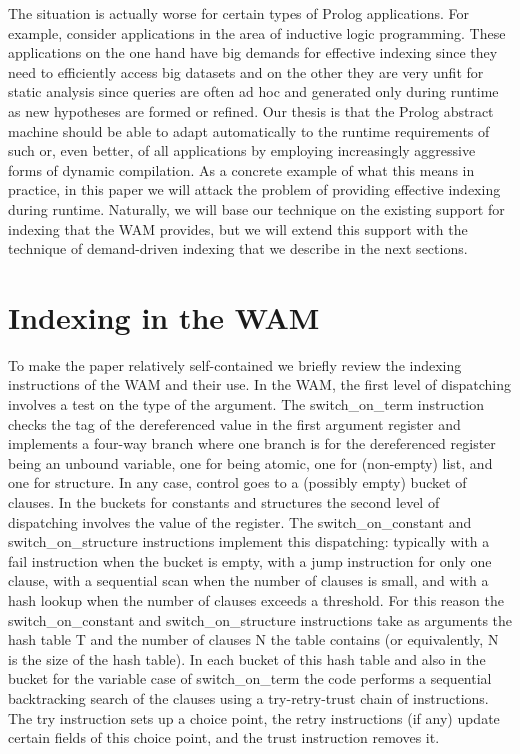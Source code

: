 \documentclass{llncs}
\newcommand{\instr}[1]{\textsf{#1}}
\newcommand{\try}{\instr{try}\xspace}
\newcommand{\retry}{\mbox{\instr{retry}}\xspace}
\newcommand{\trust}{\instr{trust}\xspace}
\newcommand{\TryRetryTrust}{\mbox{\instr{try-retry-trust}}\xspace}
\newcommand{\fail}{\instr{fail}\xspace}
\newcommand{\jump}{\instr{jump}\xspace}
\newcommand{\switchONterm}{\mbox{\instr{switch\_on\_term}}\xspace}
\newcommand{\switchONconstant}{\mbox{\instr{switch\_on\_constant}}\xspace}
\newcommand{\switchONstructure}{\mbox{\instr{switch\_on\_structure}}\xspace}
\newcommand{\JITI}{demand-driven indexing\xspace}
\begin{document}
The situation is actually worse for certain types of Prolog
applications. For example, consider applications in the area of
inductive logic programming. These applications on the one hand have
big demands for effective indexing since they need to efficiently
access big datasets and on the other they are very unfit for static
analysis since queries are often ad hoc and generated only during
runtime as new hypotheses are formed or refined.
%
Our thesis is that the Prolog abstract machine should be able to adapt
automatically to the runtime requirements of such or, even better, of
all applications by employing increasingly aggressive forms of dynamic
compilation. As a concrete example of what this means in practice, in
this paper we will attack the problem of providing effective indexing
during runtime. Naturally, we will base our technique on the existing
support for indexing that the WAM provides, but we will extend this
support with the technique of \JITI that we describe in the next
sections.



\section{Indexing in the WAM} \label{sec:prelims}
To make the paper relatively self-contained we briefly review the
indexing instructions of the WAM and their use. In the WAM, the first
level of dispatching involves a test on the type of the argument. The
\switchONterm instruction checks the tag of the dereferenced value in
the first argument register and implements a four-way branch where one
branch is for the dereferenced register being an unbound variable, one
for being atomic, one for (non-empty) list, and one for structure. In
any case, control goes to a (possibly empty) bucket of clauses. In the
buckets for constants and structures the second level of dispatching
involves the value of the register. The \switchONconstant and
\switchONstructure instructions implement this dispatching: typically
with a \fail instruction when the bucket is empty, with a \jump
instruction for only one clause, with a sequential scan when the
number of clauses is small, and with a hash lookup when the number of
clauses exceeds a threshold. For this reason the \switchONconstant and
\switchONstructure instructions take as arguments the hash table
\instr{T} and the number of clauses \instr{N} the table contains (or
equivalently, \instr{N} is the size of the hash table). In each bucket
of this hash table and also in the bucket for the variable case of
\switchONterm the code performs a sequential backtracking search of
the clauses using a \TryRetryTrust chain of instructions. The \try
instruction sets up a choice point, the \retry instructions (if any)
update certain fields of this choice point, and the \trust instruction
removes it.
\end{document}
